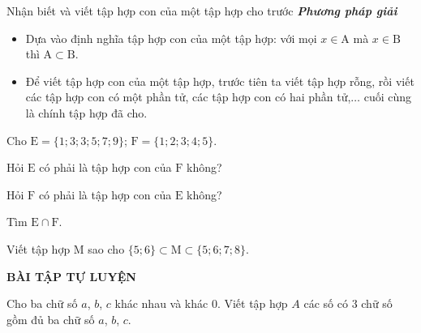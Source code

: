 \begin{dang}{Nhận biết và viết tập hợp con của một tập hợp cho trước}
	\textbf{\textit{Phương pháp giải}}
	\begin{itemize}
		\item Dựa vào định nghĩa tập hợp con của một tập hợp: với mọi $x\in \mathrm{A}$ mà $x\in \mathrm{B}$ thì $\mathrm{A}\subset\mathrm{B}$.
		\item Để viết tập hợp con của một tập hợp, trước tiên ta viết tập hợp rỗng, rồi viết các tập hợp con có một phần tử, các tập hợp con có hai phần tử,$\ldots$ cuối cùng là chính tập hợp đã cho.
	\end{itemize}
\end{dang}

\begin{vd}
	Cho $\mathrm{E}=\{1; 3; 3; 5; 7; 9\}$; $\mathrm{F}=\{1; 2; 3; 4; 5\}$.
\begin{enumEX}{1}
	\item Hỏi $\mathrm{E}$ có phải là tập hợp con của $\mathrm{F}$ không?
	\item Hỏi $\mathrm{F}$ có phải là tập hợp con của $\mathrm{E}$ không?
	\item Tìm $\mathrm{E}\cap\mathrm{F}$.
\end{enumEX}
\end{vd}

\begin{vd}
	Viết tập hợp $\mathrm{M}$ sao cho $\{5; 6\}\subset\mathrm{M}\subset\{5; 6; 7; 8\}$.
\end{vd}
\begin{center}
	\textbf{BÀI TẬP TỰ LUYỆN}
\end{center}

\begin{bt}%
Cho ba chữ số $a$, $b$, $c$ khác nhau và khác $0$. Viết tập hợp $A$ các số có $3$ chữ số gồm đủ ba chữ số $a$, $b$, $c$.
\end{bt}

